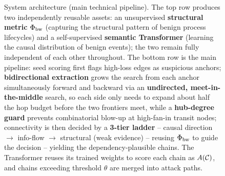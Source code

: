 \begin{figure}[t]
{%
}
\caption{System architecture (main technical pipeline). The top row
produces two independently reusable assets: an unsupervised
\textbf{structural metric} $\Phi_{\text{bw}}$ (capturing the
structural pattern of benign process lifecycles) and a
self-supervised \textbf{semantic Transformer} (learning the causal
distribution of benign events); the two remain fully independent of
each other throughout. The bottom row is the main pipeline: seed
scoring first flags high-loss edges as suspicious anchors;
\textbf{bidirectional extraction} grows the search from each anchor
simultaneously forward and backward via an \textbf{undirected,
meet-in-the-middle} search, so each side only needs to expand about
half the hop budget before the two frontiers meet, while a
\textbf{hub-degree guard} prevents combinatorial blow-up at
high-fan-in transit nodes; connectivity is then decided by a
\textbf{3-tier ladder} -- causal direction $\to$ info-flow $\to$
structural (weak evidence) -- reusing $\Phi_{\text{bw}}$ to guide the
decision -- yielding the dependency-plausible chains. The Transformer
reuses its trained weights to score each chain as $A(\mathcal{C})$, and
chains exceeding threshold $\theta$ are merged into attack paths.}
\label{fig:architecture}
\end{figure}

